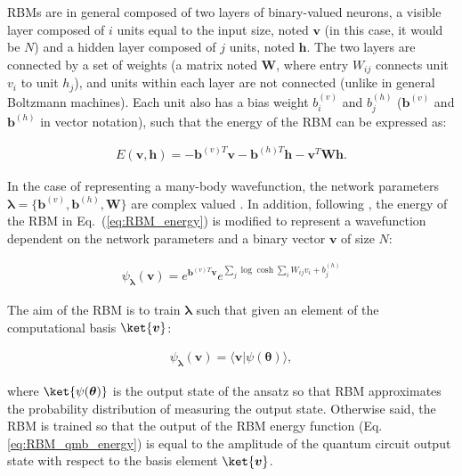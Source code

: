 RBMs are in general composed of two layers of binary-valued neurons, a visible layer composed of $i$ units equal to the input size, noted $\boldsymbol{v}$ (in this case, it would be $N$) and a hidden layer composed of $j$ units, noted $\boldsymbol{h}$. The two layers are connected by a set of weights (a matrix noted $\boldsymbol{W}$, where entry $W_{ij}$ connects unit $v_i$ to unit $h_j$), and units within each layer are not connected (unlike in general Boltzmann machines). Each unit also has a bias weight $b_i^{(v)}$ and $b_j^{(h)}$ ($\boldsymbol{b}^{(v)}$ and $\boldsymbol{b}^{(h)}$ in vector notation), such that the energy of the RBM can be expressed as: 

\begin{align} \label{eq:RBM_energy}
    E(\boldsymbol{v}, \boldsymbol{h}) = - \boldsymbol{b}^{(v)T}\boldsymbol{v} - \boldsymbol{b}^{(h)T}\boldsymbol{h} - \boldsymbol{v}^{T}\boldsymbol{W}\boldsymbol{h}.
\end{align}

In the case of representing a many-body wavefunction, the network parameters $\boldsymbol{\lambda} = \{\boldsymbol{b}^{(v)}, \boldsymbol{b}^{(h)}, \boldsymbol{W}\}$ are complex valued \cite{Carleo2017}. In addition, following \cite{Torlai2020}, the energy of the RBM in Eq.~(\ref{eq:RBM_energy}) is modified to represent a wavefunction dependent on the network parameters and a binary vector $\boldsymbol{v}$ of size $N$:

\begin{align} \label{eq:RBM_qmb_energy}
    \psi_{\boldsymbol{\lambda}}(\boldsymbol{v}) = e^{\boldsymbol{b}^{(v)T}\boldsymbol{v}}e^{\sum_j \log \cosh{\sum_i W_{ij} v_i + b^{(h)}_j} }
\end{align}

The aim of the RBM is to train $\boldsymbol{\lambda}$ such that given an element of the computational basis $\ket{\boldsymbol{v}}$:

\begin{align}
    \psi_{\boldsymbol{\lambda}}(\boldsymbol{v}) = \langle \boldsymbol{v} | \psi(\boldsymbol{\theta}) \rangle, 
\end{align}

where $\ket{\psi(\boldsymbol{\theta})}$ is the output state of the ansatz so that RBM approximates the probability distribution of measuring the output state. Otherwise said, the RBM is trained so that the output of the RBM energy function (Eq. \ref{eq:RBM_qmb_energy}) is equal to the amplitude of the quantum circuit output state with respect to the basis element $\ket{\boldsymbol{v}}$.

